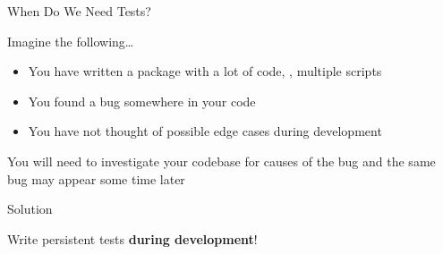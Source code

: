

\begin{frame}{When Do We Need Tests?}
  \begin{center}
    \huge\textcolor{ccyan!90!cblack}{Imagine the following\dots}
  \end{center}
  \begin{itemize}
    \item You have written a package with a lot of code, \eg, multiple scripts
    \item You found a bug somewhere in your code
    \item You have not thought of possible edge cases during development
  \end{itemize}
  \vspace{1em}
  \begin{center}
    \huge\textcolor{cpink!90!cblack}{\to{} You will need to investigate your codebase for
    causes of the bug and the same bug may appear some time later}
  \end{center}
\end{frame}

\begin{frame}{Solution}
  \begin{center}
    \huge\textcolor{ccyan!90!cblack}{Write persistent tests \textbf{during development}!}\\
  \end{center}
\end{frame}


